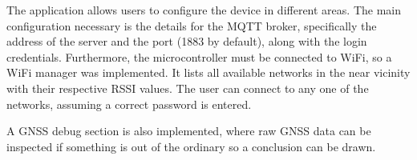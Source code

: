 \documentclass[FM,BP,EN,fonts]{tulthesis}
\begin{document}
The application allows users to configure the device in different areas. The main configuration necessary is the details for the MQTT broker, specifically the address of the server and the port (1883 by default), along with the login credentials. Furthermore, the microcontroller must be connected to WiFi, so a WiFi manager was implemented. It lists all available networks in the near vicinity with their respective RSSI values. The user can connect to any one of the networks, assuming a correct password is entered.

A GNSS debug section is also implemented, where raw GNSS data can be inspected if something is out of the ordinary so a conclusion can be drawn.

\begin{figure}[ht]
    \centering

\end{figure}
\end{document}

